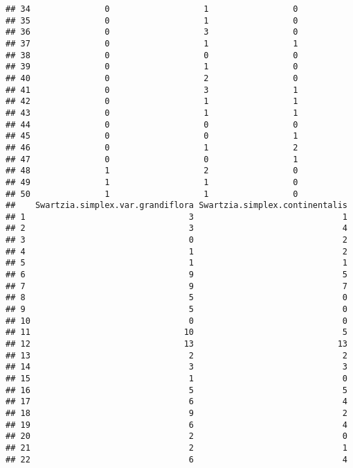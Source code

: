 \documentclass[
]{article}
\begin{document}
\begin{verbatim}
## 34               0                   1                 0
## 35               0                   1                 0
## 36               0                   3                 0
## 37               0                   1                 1
## 38               0                   0                 0
## 39               0                   1                 0
## 40               0                   2                 0
## 41               0                   3                 1
## 42               0                   1                 1
## 43               0                   1                 1
## 44               0                   0                 0
## 45               0                   0                 1
## 46               0                   1                 2
## 47               0                   0                 1
## 48               1                   2                 0
## 49               1                   1                 0
## 50               1                   1                 0
##    Swartzia.simplex.var.grandiflora Swartzia.simplex.continentalis
## 1                                 3                              1
## 2                                 3                              4
## 3                                 0                              2
## 4                                 1                              2
## 5                                 1                              1
## 6                                 9                              5
## 7                                 9                              7
## 8                                 5                              0
## 9                                 5                              0
## 10                                0                              0
## 11                               10                              5
## 12                               13                             13
## 13                                2                              2
## 14                                3                              3
## 15                                1                              0
## 16                                5                              5
## 17                                6                              4
## 18                                9                              2
## 19                                6                              4
## 20                                2                              0
## 21                                2                              1
## 22                                6                              4

\end{verbatim}
\end{document}
